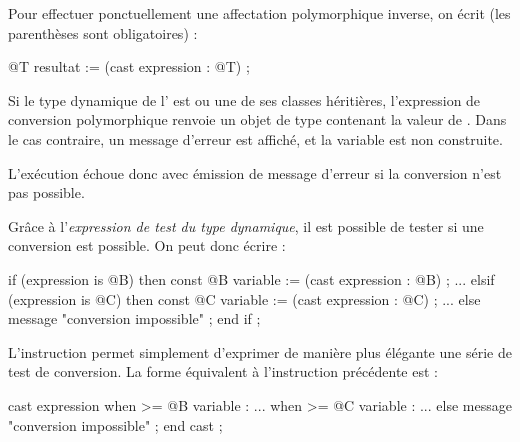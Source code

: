 Pour effectuer ponctuellement une affectation polymorphique inverse, on écrit (les parenthèses sont obligatoires) :

\begin{galgascode}
@T resultat := (cast expression : @T) ;
\end{galgascode}

Si le type dynamique de l' est  ou une de ses classes héritières, l'expression de conversion polymorphique renvoie un objet de type  contenant la valeur de . Dans le cas contraire, un message d'erreur est affiché, et la variable  est non construite.

L'exécution échoue donc avec émission de message d'erreur si la conversion n'est pas possible. 


Grâce à l'\emph{expression de test du type dynamique}, il est possible de tester si une conversion est possible. On peut donc écrire :

\begin{galgascode}
if (expression is @B) then
  const @B variable := (cast expression : @B) ;
  ...
elsif (expression is @C) then
  const @C variable := (cast expression : @C) ;
  ...
else
  message "conversion impossible" ;
end if ;
\end{galgascode}

L'instruction  permet simplement d'exprimer de manière plus élégante une série de test de conversion. La forme équivalent à l'instruction  précédente est :

\begin{galgascode}
cast expression
when >= @B variable :
  ...
when >= @C variable :
  ...
else
  message "conversion impossible" ;
end cast ;
\end{galgascode}


